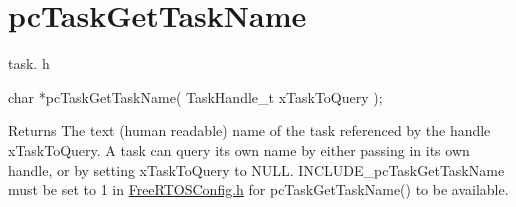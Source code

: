 \hypertarget{group__pc_task_get_task_name}{}\section{pc\+Task\+Get\+Task\+Name}
\label{group__pc_task_get_task_name}
task. h 
\begin{DoxyPre}char *pcTaskGetTaskName( TaskHandle\_t xTaskToQuery );\end{DoxyPre}


\begin{DoxyReturn}{Returns}
The text (human readable) name of the task referenced by the handle x\+Task\+To\+Query. A task can query its own name by either passing in its own handle, or by setting x\+Task\+To\+Query to N\+U\+L\+L. I\+N\+C\+L\+U\+D\+E\+\_\+pc\+Task\+Get\+Task\+Name must be set to 1 in \hyperlink{_free_r_t_o_s_config_8h_source}{Free\+R\+T\+O\+S\+Config.\+h} for pc\+Task\+Get\+Task\+Name() to be available. 
\end{DoxyReturn}
